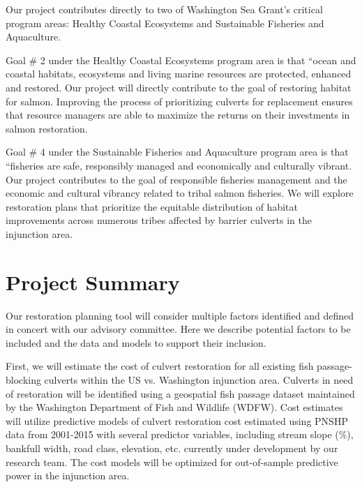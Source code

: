 \documentclass[12pt]{elsarticle}
\begin{document}
Our project contributes directly to two of Washington Sea Grant's critical program areas: Healthy Coastal Ecosystems and Sustainable Fisheries and Aquaculture. 

Goal \# 2 under the Healthy Coastal Ecosystems program area is that ``ocean and coastal habitats, ecosystems and living marine resources are protected, enhanced and restored. Our project will directly contribute to the goal of restoring habitat for salmon. Improving the process of prioritizing culverts for replacement ensures that resource managers are able to maximize the returns on their investments in salmon restoration.

Goal \# 4 under the Sustainable Fisheries and Aquaculture program area is that ``fisheries are safe, responsibly managed and economically and culturally vibrant. Our project contributes to the goal of responsible fisheries management and the economic and cultural vibrancy related to tribal salmon fisheries. We will explore restoration plans that prioritize the equitable distribution of habitat improvements across numerous tribes affected by barrier culverts in the injunction area. 

\section{Project Summary} %

Our restoration planning tool will consider multiple factors identified and defined in concert with our advisory committee. Here we describe potential factors to be included and the data and models to support their inclusion.   

First, we will estimate the cost of culvert restoration for all existing fish passage-blocking culverts within the US vs. Washington injunction area. Culverts in need of restoration will be identified using a geospatial fish passage dataset maintained by the Washington Department of Fish and Wildlife (WDFW). Cost estimates will utilize predictive models of culvert restoration cost estimated using PNSHP data from 2001-2015 with several predictor variables, including stream slope (\%), bankfull width, road class, elevation, etc. currently under development by our research team. The cost models will be optimized for out-of-sample predictive power in the injunction area.
\end{document}
